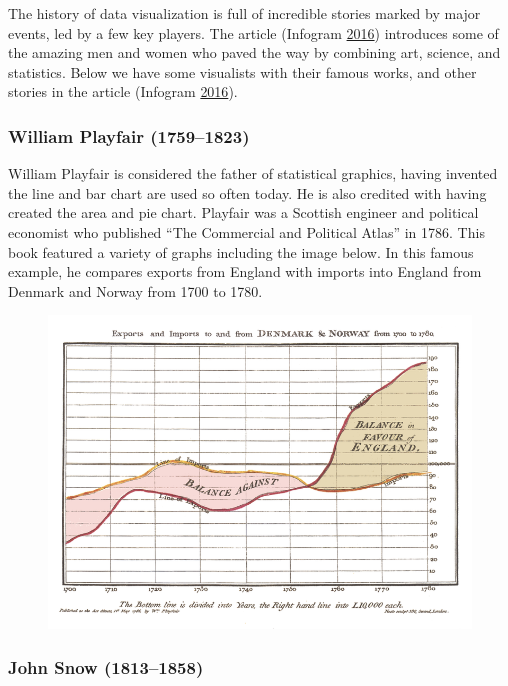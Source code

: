 \documentclass[]{book}
\begin{document}
The history of data visualization is full of incredible stories marked
by major events, led by a few key players. The article (Infogram
\protect\hyperlink{ref-history_viz}{2016}) introduces some of the
amazing men and women who paved the way by combining art, science, and
statistics. Below we have some visualists with their famous works, and
other stories in the article (Infogram
\protect\hyperlink{ref-history_viz}{2016}).

\subsubsection{William Playfair
(1759--1823)}\label{william-playfair-17591823}

William Playfair is considered the father of statistical graphics,
having invented the line and bar chart are used so often today. He is
also credited with having created the area and pie chart. Playfair was a
Scottish engineer and political economist who published ``The Commercial
and Political Atlas'' in 1786. This book featured a variety of graphs
including the image below. In this famous example, he compares exports
from England with imports into England from Denmark and Norway from 1700
to 1780.

\begin{figure}
\centering
\includegraphics{images/Playfair.png}
\caption{}
\end{figure}

\subsubsection{John Snow (1813--1858)}\label{john-snow-18131858}
\end{document}
